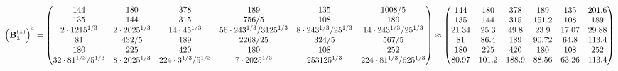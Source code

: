 \documentclass[10pt,a4paper]{article}
\begin{document}
	\[
		\left(\bold{B_1^{(1)}}\right)^{4} = 
		\begin{pmatrix}
			{{144}}{} & {{180}}{} & {{378}}{} & {{189}}{} & {{135}}{} & {{1008}} / {{5}} \\
			{{135}}{} & {{144}}{} & {{315}}{} & {{756}} / {{5}} & {{108}}{} & {{189}}{} \\
			{{2} \cdot {1215^ {1 / 3}}}{} & {{2} \cdot {2025^ {1 / 3}}}{} & {{14} \cdot {45^ {1 / 3}}}{} & {{56} \cdot {243^ {1 / 3}}} / {{3125^ {1 / 3}}} & {{8} \cdot {243^ {1 / 3}}} / {{25^ {1 / 3}}} & {{14} \cdot {243^ {1 / 3}}} / {{25^ {1 / 3}}} \\
			{{81}}{} & {{432}} / {{5}} & {{189}}{} & {{2268}} / {{25}} & {{324}} / {{5}} & {{567}} / {{5}} \\
			{{180}}{} & {{225}}{} & {{420}}{} & {{180}}{} & {{108}}{} & {{252}}{} \\
			{{32} \cdot {81^ {1 / 3}}} / {{5^ {1 / 3}}} & {{8} \cdot {2025^ {1 / 3}}}{} & {{224} \cdot {3^ {1 / 3}}} / {{5^ {1 / 3}}} & {{7} \cdot {2025^ {1 / 3}}}{} & {{253125^ {1 / 3}}}{} & {{224} \cdot {81^ {1 / 3}}} / {{625^ {1 / 3}}} \\
		\end{pmatrix}
		\approx
		\begin{pmatrix}
			144      & 180      & 378      & 189      & 135      & 201.6    \\
			135      & 144      & 315      & 151.2    & 108      & 189      \\
			21.34    & 25.3     & 49.8     & 23.9     & 17.07    & 29.88    \\
			81       & 86.4     & 189      & 90.72    & 64.8     & 113.4    \\
			180      & 225      & 420      & 180      & 108      & 252      \\
			80.97    & 101.2    & 188.9    & 88.56    & 63.26    & 113.4    \\
		\end{pmatrix}
	\]
\end{document}
